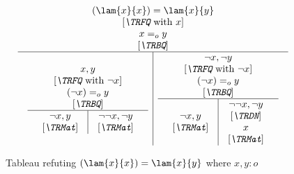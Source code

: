 \begin{figure}[t]
\begin{equation*}
  \begin{array}{c}
    (\lam{x}{x}) = \lam{x}{y} \\
    {\mbox{[${\emph{\TRFQ}}$ with $x$]}} \\
    x =_o y \\
    {\mbox{[${\emph{\TRBQ}}$]}} \\
    \hline
    \begin{array}{c|c}
      \begin{array}{c}
        x,y\\
        {\mbox{[${\emph{\TRFQ}}$ with $\neg x$]}} \\
    (\neg x) =_o y \\
    {\mbox{[${\emph{\TRBQ}}$]}} \\
        \hline
        \begin{array}{c|c}
          \begin{array}{c}
            \neg x,y
            \\ {\mbox{[${\emph{\TRMat}}$]}}
          \end{array}
          &
          \begin{array}{c}
            \neg \neg x,\neg y
            \\ {\mbox{[${\emph{\TRMat}}$]}}
          \end{array}
        \end{array}
      \end{array}          
      &
      \begin{array}{c}
        \neg x,\neg y\\
        {\mbox{[${\emph{\TRFQ}}$ with $\neg x$]}} \\
    (\neg x) =_o y \\
    {\mbox{[${\emph{\TRBQ}}$]}} \\
        \hline
        \begin{array}{c|c}
          \begin{array}{c}
            \neg x,y
            \\ {\mbox{[${\emph{\TRMat}}$]}}
          \end{array}
          &
          \begin{array}{c}
            \neg \neg x,\neg y\\
            {\mbox{[${\emph{\TRDN}}$]}} \\
            x
            \\ {\mbox{[${\emph{\TRMat}}$]}}
          \end{array}
        \end{array}
      \end{array}          
    \end{array}
  \end{array}
\end{equation*}  
\caption{Tableau refuting $(\lam{x}{x}) = \lam{x}{y}$ where $x,y:o$}
\label{fig:refutationneg}
\end{figure}

